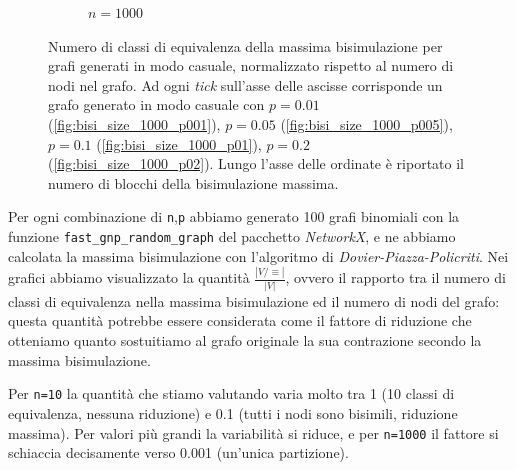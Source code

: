 \begin{figure}[H]
{        \begin{subfigure}[b]{0.5\textwidth}
            \caption{$n=1000$}
            \label{fig:bisi_dim_1000}
        \end{subfigure}
    }
    \caption{Numero di classi di equivalenza della massima bisimulazione per grafi generati in modo casuale, normalizzato rispetto al numero di nodi nel grafo. Ad ogni \emph{tick} sull'asse delle ascisse corrisponde un grafo generato in modo casuale con $p=0.01$ (\ref*{fig:bisi_size_1000_p001}), $p=0.05$ (\ref*{fig:bisi_size_1000_p005}), $p=0.1$ (\ref*{fig:bisi_size_1000_p01}), $p=0.2$ (\ref*{fig:bisi_size_1000_p02}). Lungo l'asse delle ordinate è riportato il numero di blocchi della bisimulazione massima.}
    \label{fig:bisi_size}
\end{figure}

Per ogni combinazione di \verb|n|,\verb|p| abbiamo generato 100 grafi binomiali con la funzione \verb|fast_gnp_random_graph| del pacchetto \emph{NetworkX}, e ne abbiamo calcolata la massima bisimulazione con l'algoritmo di \emph{Dovier-Piazza-Policriti}. Nei grafici abbiamo visualizzato la quantità $\frac{|V / \equiv|}{|V|}$, ovvero il rapporto tra il numero di classi di equivalenza nella massima bisimulazione ed il numero di nodi del grafo: questa quantità potrebbe essere considerata come il fattore di riduzione che otteniamo quanto sostuitiamo al grafo originale la sua contrazione secondo la massima bisimulazione.

Per \verb|n=10| la quantità che stiamo valutando varia molto tra 1 (10 classi di equivalenza, nessuna riduzione) e 0.1 (tutti i nodi sono bisimili, riduzione massima). Per valori più grandi la variabilità si riduce, e per \verb|n=1000| il fattore si schiaccia decisamente verso 0.001 (un'unica partizione).
